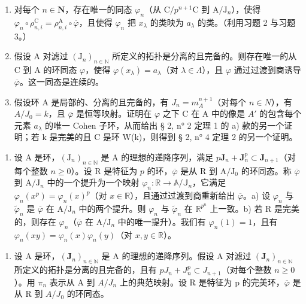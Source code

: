 \begin{enumerate}
\def\labelenumi{\alph{enumi})}
\item
  对每个 \(n\in\mathbf{N}\)，存在唯一的同态 \(\varphi_{n}\)（从 \(\mathrm{C}/p^{n+1}\mathrm{C}\) 到 \(\mathrm{A}/\mathrm{J}_{n}\)），使得 \(\varphi_{n}\circ\rho_{n,i}^{\mathrm{C}}=\rho_{n,i}^{\mathrm{A}}\circ\overline{\varphi}\)，且使得 \(\varphi_{n}\) 把 \(x_{\lambda}\) 的类映为 \(a_{\lambda}\) 的类。（利用习题 2 与习题 3。）
\item
  假设 A 对滤过 \((\mathrm{J}_{n})_{n\in\mathbb{N}}\) 所定义的拓扑是分离的且完备的。则存在唯一的从 C 到 A 的环同态 \(\varphi\)，使得 \(\varphi(x_{\lambda}) = a_{\lambda}\)（对 \(\lambda \in \Lambda\)），且 \(\varphi\) 通过过渡到商诱导 \(\overline{\varphi}\)。这一同态是连续的。
\item
  假设环 A 是局部的、分离的且完备的，有 \(J_{n} = m_{A}^{n+1}\)（对每个 \(n \in N\)），有 \(A/J_{0} = k\)，且 \(\overline{\varphi}\) 是恒等映射。证明在 \(\varphi\) 之下 C 在 A 中的像是 \(A'\) 的包含每个元素 \(a_{\lambda}\) 的唯一 Cohen 子环，从而给出 § 2, n° 2 定理 1 的 a) 款的另一个证明；若 k 是完美的且 C 是环 W(k)，则得到 § 2, n° 4 定理 2 的另一个证明。
\end{enumerate}

\begin{enumerate}
\def\labelenumi{\arabic{enumi})}
\setcounter{enumi}{4}
\tightlist
\item
  设 A 是环，\((\mathrm{J}_n)_{n\in \mathbb{N}}\) 是 A 的理想的递降序列，满足 \(p\mathbf{J}_n + \mathbf{J}_n^p\subset \mathbf{J}_{n + 1}\)（对每个整数 \(n\geqslant 0\)）。设 R 是特征为 \(p\) 的环，\(\overline{\varphi}\) 是从 R 到 \(\mathrm{A} / \mathrm{J}_0\) 的环同态。称 \(\overline{\varphi}\) 到 \(\mathrm{A} / \mathrm{J}_n\) 中的一个提升为一个映射 \(\varphi_n:\mathbb{R}\to \mathbb{A} / \mathbb{J}_n\)，它满足 \(\varphi_n(x^p) = \varphi_n(x)^p\)（对 \(x\in \mathbb{R}\)），且通过过渡到商重新给出 \(\overline{\varphi}\)。a) 设 \(\varphi_n\) 与 \(\widetilde{\varphi}_n\) 是 \(\overline{\varphi}\) 在 \(\mathrm{A} / \mathrm{J}_n\) 中的两个提升。则 \(\varphi_n\) 与 \(\widetilde{\varphi}_n\) 在 \(\mathbb{R}^{p^n}\) 上一致。b) 若 R 是完美的，则存在 \(\varphi_n\)（\(\overline{\varphi}\) 在 \(\mathrm{A} / \mathrm{J}_n\) 中的唯一提升）。我们有 \(\varphi_n(1) = 1\)，且有 \(\varphi_n(xy) = \varphi_n(x)\varphi_n(y)\)（对 \(x,y\in \mathbb{R}\)）。
\end{enumerate}

\begin{enumerate}
\def\labelenumi{\arabic{enumi})}
\setcounter{enumi}{5}
\tightlist
\item
  设 A 是环，\((\mathbf{J}_{n})_{n\in\mathbb{N}}\) 是 A 的理想的递降序列。假设 A 对滤过 \((\mathbf{J}_{n})_{n\in\mathbb{N}}\) 所定义的拓扑是分离的且完备的，且有 \(pJ_{n} + J_{n}^{p} \subset J_{n+1}\)（对每个整数 \(n \geqslant 0\)）。用 \(\pi_{n}\) 表示从 A 到 \(A/J_{n}\) 上的典范映射。设 R 是特征为 p 的完美环，\(\overline{\varphi}\) 是从 R 到 \(A/J_{0}\) 的环同态。
\end{enumerate}

